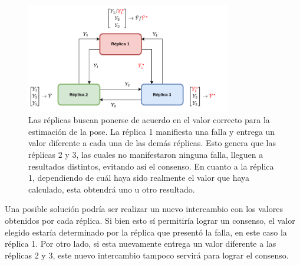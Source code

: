 \begin{figure}[htb]
    \centering
    \includegraphics[width=0.8\textwidth]{img/TMR_sin_arbitro_consenso_falla.png}
    \caption{Las réplicas buscan ponerse de acuerdo en el valor correcto para la estimación de la pose. La réplica 1 manifiesta una falla y entrega un valor diferente a cada una de las demás réplicas. Esto genera que las réplicas 2 y 3, las cuales no manifestaron ninguna falla, lleguen a resultados distintos, evitando así el consenso. En cuanto a la réplica 1, dependiendo de cuál haya sido realmente el valor que haya calculado, esta obtendrá uno u otro resultado.}
    \label{fig:TMR_sin_arbitro_consenso_falla}
\end{figure}



Una posible solución podría ser realizar un nuevo intercambio con los valores obtenidos por cada réplica. Si bien esto sí permitiría lograr un consenso, el valor elegido estaría determinado por la réplica que presentó la falla, en este caso la réplica 1. Por otro lado, si esta nuevamente entrega un valor diferente a las réplicas 2 y 3, este nuevo intercambio tampoco servirá para lograr el consenso.

